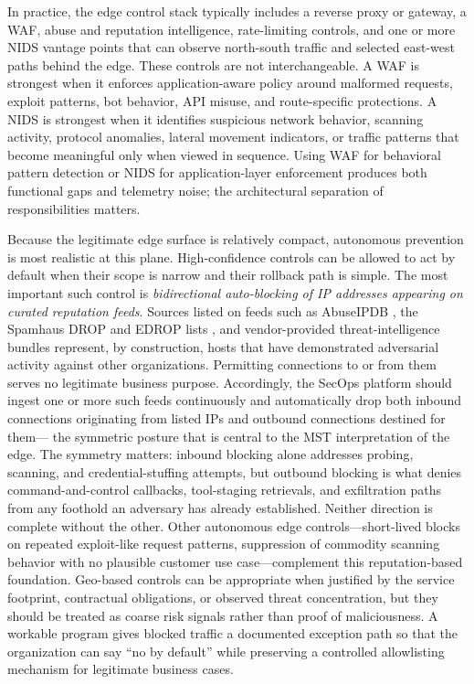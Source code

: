 \documentclass[acmlarge]{acmart}
\begin{document}
In practice, the edge control stack typically includes a reverse proxy or gateway, a WAF,
abuse and reputation intelligence, rate-limiting controls, and one or more NIDS vantage
points that can observe north-south traffic and selected east-west paths behind the edge.
These controls are not interchangeable. A WAF is strongest when it enforces
application-aware policy around malformed requests, exploit patterns, bot behavior,
API misuse, and route-specific protections. A NIDS is strongest when it identifies
suspicious network behavior, scanning activity, protocol anomalies, lateral movement
indicators, or traffic patterns that become meaningful only when viewed in sequence.
Using WAF for behavioral pattern detection or NIDS for application-layer enforcement
produces both functional gaps and telemetry noise; the architectural separation of
responsibilities matters.

Because the legitimate edge surface is relatively compact, autonomous prevention is most
realistic at this plane. High-confidence controls can be allowed to act by default when
their scope is narrow and their rollback path is simple. The most important such control is \textit{bidirectional auto-blocking of IP addresses appearing on curated reputation feeds}.
Sources listed on feeds such as AbuseIPDB \cite{abuseipdb2024}, the Spamhaus DROP and EDROP lists \cite{spamhaus2024}, and
vendor-provided threat-intelligence bundles represent, by construction, hosts that have
demonstrated adversarial activity against other organizations. Permitting connections
to or from them serves no legitimate business purpose. Accordingly, the SecOps platform
should ingest one or more such feeds continuously and automatically drop both inbound
connections originating from listed IPs and outbound connections destined for them---
the symmetric posture that is central to the MST interpretation of the edge.
The symmetry matters: inbound blocking alone addresses probing, scanning, and
credential-stuffing attempts, but outbound blocking is what denies command-and-control
callbacks, tool-staging retrievals, and exfiltration paths from any foothold an
adversary has already established. Neither direction is complete without the other.
Other autonomous edge controls---short-lived blocks on repeated exploit-like request patterns,
suppression of commodity scanning behavior with no plausible customer use case---complement
this reputation-based foundation. Geo-based controls
can be appropriate when justified by the service footprint, contractual obligations, or
observed threat concentration, but they should be treated as coarse risk signals rather
than proof of maliciousness. A workable program gives blocked traffic a documented
exception path so that the organization can say ``no by default'' while preserving a
controlled allowlisting mechanism for legitimate business cases.
\end{document}

